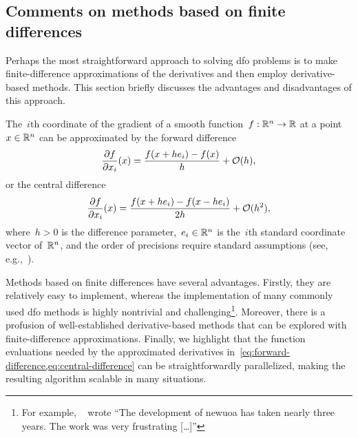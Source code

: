 \subsection{Comments on methods based on finite differences}
\label{subsec:finite-difference}

Perhaps the most straightforward approach to solving \gls{dfo} problems is to make finite-difference approximations of the derivatives and then employ derivative-based methods.
This section  briefly discusses the advantages and disadvantages of this approach.

The~$i$th coordinate of the gradient of a smooth function~$f : \mathbb{R}^n \to \mathbb{R}$ at a point~$\iter \in \R^n$ can be approximated by the forward difference
\begin{equation}
    \label{eq:forward-difference}
    \frac{\partial \obj}{\partial x_i}(\iter) = \frac{\obj(\iter + h e_i) - \obj(\iter)}{h} + \bigo(h),
\end{equation}
or the central difference
\begin{equation}
    \label{eq:central-difference}
    \frac{\partial \obj}{\partial x_i}(\iter) = \frac{\obj(\iter + h e_i) - \obj(\iter - h e_i)}{2h} + \bigo(h^2),
\end{equation}
where~$h > 0$ is the difference parameter,~$e_i \in \mathbb{R}^n$ is the~$i$th standard coordinate vector of~$\mathbb{R}^n$, and the order of precisions require standard assumptions (see, e.g.,~\cite[\S~8.1]{Nocedal_Wright_2006}).

Methods based on finite differences have several advantages.
Firstly, they are relatively easy to implement, whereas the implementation of many commonly used \gls{dfo} methods is highly nontrivial and challenging\footnote{For example, \citeauthor{Powell_2006}~\cite{Powell_2006} wrote \enquote{The development of \gls{newuoa} has taken nearly three years. The work was very frustrating [\dots]}}.
Moreover, there is a profusion of well-established derivative-based methods that can be explored with finite-difference approximations.
Finally, we highlight that the function evaluations needed by the approximated derivatives in~\cref{eq:forward-difference,eq:central-difference} can be straightforwardly parallelized, making the resulting algorithm scalable in many situations.

